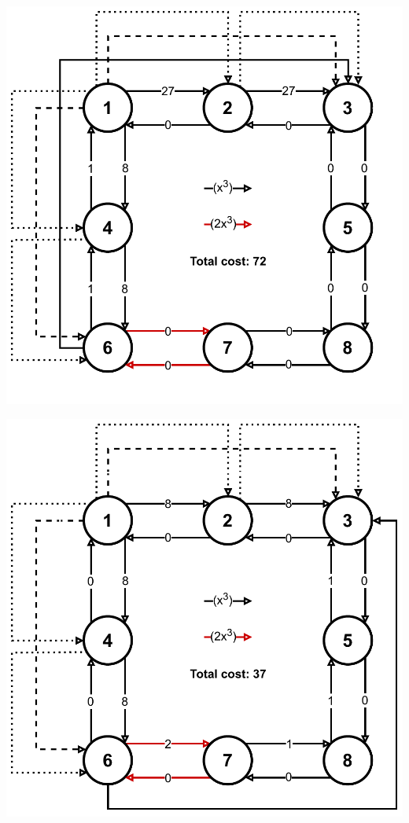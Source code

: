 {\begin{minipage}{0.3\textwidth}
        \includegraphics[width=\linewidth]{Img/cex_greedy2.pdf}
    \end{minipage}
    \begin{minipage}{0.3\textwidth}
        \includegraphics[width=\linewidth]{Img/cex_opt2.pdf}
    \end{minipage}
    \label{fig:cex}
}
